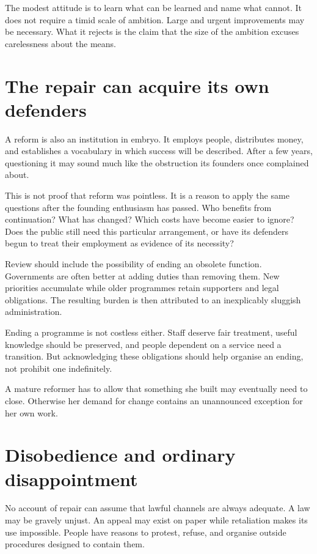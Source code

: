\documentclass[12pt,a4paper]{book}
\begin{document}
The modest attitude is to learn what can be learned and name what cannot. It does not require a timid scale of ambition. Large and urgent improvements may be necessary. What it rejects is the claim that the size of the ambition excuses carelessness about the means.

\section*{The repair can acquire its own defenders}

A reform is also an institution in embryo. It employs people, distributes money, and establishes a vocabulary in which success will be described. After a few years, questioning it may sound much like the obstruction its founders once complained about.

This is not proof that reform was pointless. It is a reason to apply the same questions after the founding enthusiasm has passed. Who benefits from continuation? What has changed? Which costs have become easier to ignore? Does the public still need this particular arrangement, or have its defenders begun to treat their employment as evidence of its necessity?

Review should include the possibility of ending an obsolete function. Governments are often better at adding duties than removing them. New priorities accumulate while older programmes retain supporters and legal obligations. The resulting burden is then attributed to an inexplicably sluggish administration.

Ending a programme is not costless either. Staff deserve fair treatment, useful knowledge should be preserved, and people dependent on a service need a transition. But acknowledging these obligations should help organise an ending, not prohibit one indefinitely.

A mature reformer has to allow that something she built may eventually need to close. Otherwise her demand for change contains an unannounced exception for her own work.

\section*{Disobedience and ordinary disappointment}

No account of repair can assume that lawful channels are always adequate. A law may be gravely unjust. An appeal may exist on paper while retaliation makes its use impossible. People have reasons to protest, refuse, and organise outside procedures designed to contain them.
\end{document}
